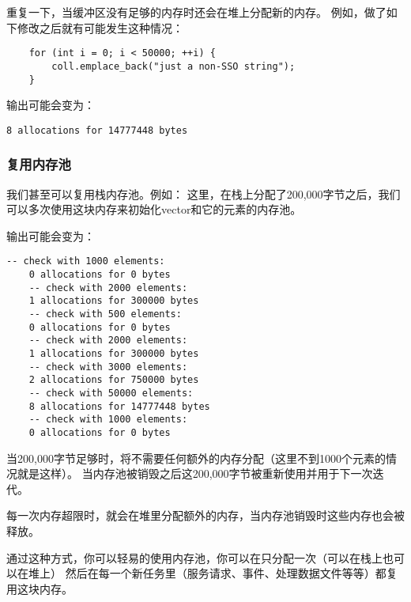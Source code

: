 重复一下，当缓冲区没有足够的内存时还会在堆上分配新的内存。
例如，做了如下修改之后就有可能发生这种情况：
\begin{lstlisting}
    for (int i = 0; i < 50000; ++i) {
        coll.emplace_back("just a non-SSO string");
    }
\end{lstlisting}
输出可能会变为：
\begin{lstlisting}[keywordstyle=\color{black}]
    8 allocations for 14777448 bytes
\end{lstlisting}

\subsubsection{复用内存池}
我们甚至可以复用栈内存池。例如：
这里，在栈上分配了200,000字节之后，我们可以多次使用这块内存来初始化vector和它的元素的内存池。

输出可能会变为：
\begin{lstlisting}[keywordstyle=\color{black}]
    -- check with 1000 elements:
    0 allocations for 0 bytes
    -- check with 2000 elements:
    1 allocations for 300000 bytes
    -- check with 500 elements:
    0 allocations for 0 bytes
    -- check with 2000 elements:
    1 allocations for 300000 bytes
    -- check with 3000 elements:
    2 allocations for 750000 bytes
    -- check with 50000 elements:
    8 allocations for 14777448 bytes
    -- check with 1000 elements:
    0 allocations for 0 bytes
\end{lstlisting}
当200,000字节足够时，将不需要任何额外的内存分配（这里不到1000个元素的情况就是这样）。
当内存池被销毁之后这200,000字节被重新使用并用于下一次迭代。

每一次内存超限时，就会在堆里分配额外的内存，当内存池销毁时这些内存也会被释放。

通过这种方式，你可以轻易的使用内存池，你可以在只分配一次（可以在栈上也可以在堆上）
然后在每一个新任务里（服务请求、事件、处理数据文件等等）都复用这块内存。

